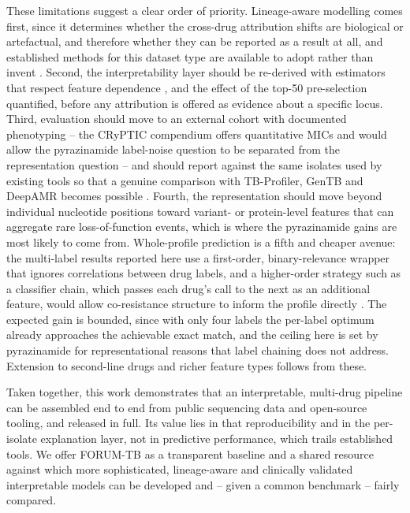 These limitations suggest a clear order of priority. Lineage-aware modelling comes first, since it determines whether the cross-drug attribution shifts are biological or artefactual, and therefore whether they can be reported as a result at all, and established methods for this dataset type are available to adopt rather than invent \cite{billows2023feature}. Second, the interpretability layer should be re-derived with estimators that respect feature dependence \cite{aas2021explaining}, and the effect of the top-50 pre-selection quantified, before any attribution is offered as evidence about a specific locus. Third, evaluation should move to an external cohort with documented phenotyping -- the CRyPTIC compendium \cite{cryptic2022compendium} offers quantitative MICs and would allow the pyrazinamide label-noise question to be separated from the representation question -- and should report against the same isolates used by existing tools so that a genuine comparison with TB-Profiler, GenTB and DeepAMR becomes possible \cite{phelan2019tbprofiler,groschel2021gentb,yang2019deepamr,ngo2019benchmarking}. Fourth, the representation should move beyond individual nucleotide positions toward variant- or protein-level features that can aggregate rare loss-of-function events, which is where the pyrazinamide gains are most likely to come from. Whole-profile prediction is a fifth and cheaper avenue: the multi-label results reported here use a first-order, binary-relevance wrapper that ignores correlations between drug labels, and a higher-order strategy such as a classifier chain, which passes each drug's call to the next as an additional feature, would allow co-resistance structure to inform the profile directly \cite{read2011classifier}. The expected gain is bounded, since with only four labels the per-label optimum already approaches the achievable exact match, and the ceiling here is set by pyrazinamide for representational reasons that label chaining does not address. Extension to second-line drugs and richer feature types follows from these.

Taken together, this work demonstrates that an interpretable, multi-drug pipeline can be assembled end to end from public sequencing data and open-source tooling, and released in full. Its value lies in that reproducibility and in the per-isolate explanation layer, not in predictive performance, which trails established tools. We offer FORUM-TB as a transparent baseline and a shared resource against which more sophisticated, lineage-aware and clinically validated interpretable models can be developed and -- given a common benchmark -- fairly compared.
